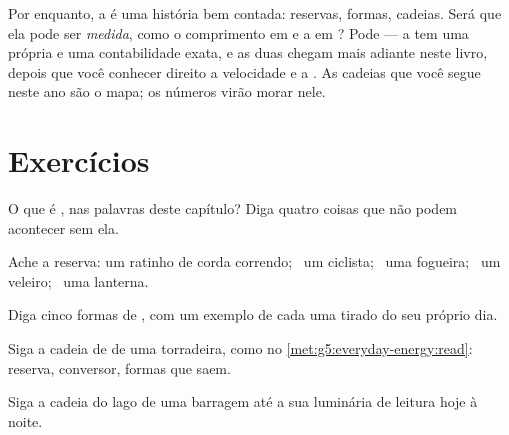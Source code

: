 \begin{remark}\label{rem:g5:everyday-energy:promise}
Por enquanto, a  é uma história bem contada: reservas, formas,
cadeias. Será que ela pode ser \emph{medida}, como o comprimento em
 e a  em ? Pode --- a  tem uma 
própria e uma contabilidade exata, e as duas chegam mais adiante
neste livro, depois que você conhecer direito a velocidade e a .
As cadeias que você segue neste ano são o mapa; os números virão
morar nele.
\end{remark}

\section{Exercícios}

\begin{exercise}[$\star$]\label{exo:g5:everyday-energy:1}
O que é , nas palavras deste capítulo? Diga quatro coisas que
não podem acontecer sem ela.
\end{exercise}

\begin{exercise}[$\star$]\label{exo:g5:everyday-energy:2}
Ache a reserva: um ratinho de corda correndo; \ um ciclista; \ uma
fogueira; \ um veleiro; \ uma lanterna.
\end{exercise}

\begin{exercise}[$\star$]\label{exo:g5:everyday-energy:3}
Diga cinco formas de , com um exemplo de cada uma tirado do
seu próprio dia.
\end{exercise}

\begin{exercise}[$\star$]\label{exo:g5:everyday-energy:4}
Siga a cadeia de  de uma torradeira, como no
\cref{met:g5:everyday-energy:read}: reserva, conversor, formas que
saem.
\end{exercise}

\begin{exercise}[$\star$]\label{exo:g5:everyday-energy:5}
Siga a cadeia do lago de uma barragem até a sua luminária de leitura
hoje à noite.
\end{exercise}

